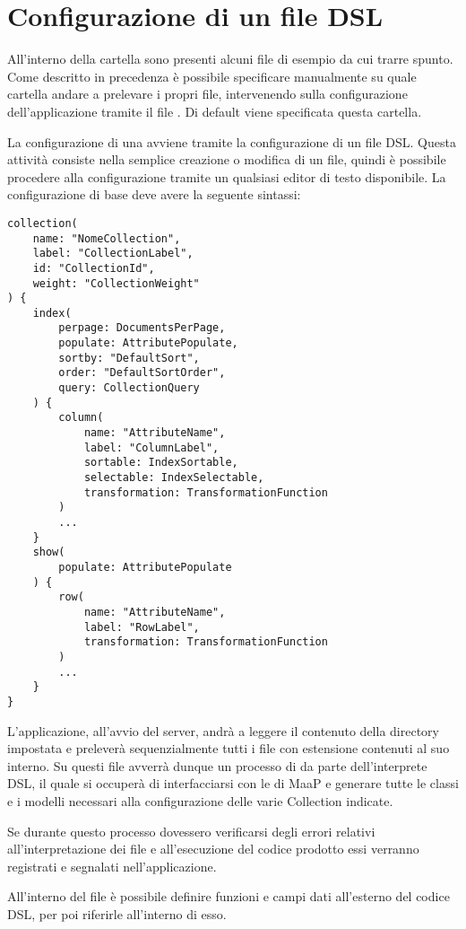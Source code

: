 \section{Configurazione di un file DSL}
\label{collection}

All'interno della cartella  sono presenti alcuni file  di esempio da cui trarre spunto. Come descritto in precedenza è possibile specificare manualmente su quale cartella andare a prelevare i propri file, intervenendo sulla configurazione dell'applicazione tramite il file . Di default viene specificata questa cartella.

La configurazione di una  avviene tramite la configurazione di un file DSL. Questa attività consiste nella semplice creazione o modifica di un file, quindi è possibile procedere alla configurazione tramite un qualsiasi editor di testo disponibile. La configurazione di base deve avere la seguente sintassi:
\medskip

\begin{lstlisting}
collection(
	name: "NomeCollection", 
	label: "CollectionLabel", 
	id: "CollectionId", 
	weight: "CollectionWeight" 
) {
	index( 
		perpage: DocumentsPerPage, 
		populate: AttributePopulate, 
		sortby: "DefaultSort", 
		order: "DefaultSortOrder", 
		query: CollectionQuery
	) {
		column(
			name: "AttributeName", 
			label: "ColumnLabel", 
			sortable: IndexSortable, 
			selectable: IndexSelectable, 
			transformation: TransformationFunction
		)
		...
	}
	show(
		populate: AttributePopulate
	) {
		row(
			name: "AttributeName", 
			label: "RowLabel", 
			transformation: TransformationFunction
		)
		...
	}
} 
\end{lstlisting}


L'applicazione, all'avvio del server, andrà a leggere il contenuto della directory impostata e preleverà sequenzialmente tutti i file con estensione  contenuti al suo interno. Su questi file avverrà dunque un processo di  da parte dell'interprete DSL, il quale si occuperà di interfacciarsi con le  di MaaP e generare tutte le classi e i modelli necessari alla configurazione delle varie Collection indicate. 

Se durante questo processo dovessero verificarsi degli errori relativi all'interpretazione dei file e all'esecuzione del codice prodotto essi verranno registrati e segnalati nell'applicazione.

All'interno del file è possibile definire funzioni e campi dati all'esterno del codice DSL, per poi riferirle all'interno di esso.

